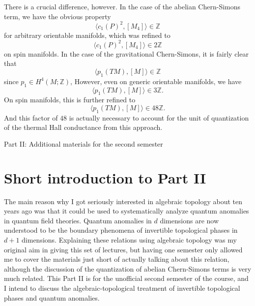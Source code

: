 \documentclass[12pt]{article}
\numberwithin{equation}{section}
\numberwithin{figure}{section}
\theoremstyle{remark}
\def\bZ{\mathbb{Z}}
\begin{document}
There is a crucial difference, however.
In the case of the abelian Chern-Simons term, we have the obvious property
\begin{equation}
\langle c_1(P)^2,[M_4]\rangle \in\bZ
\end{equation} for arbitrary orientable manifolds,
which was refined to \begin{equation}
  \langle c_1(P)^2,[M_4]\rangle \in 2 \bZ
\end{equation} on spin manifolds.
In the case of the gravitational Chern-Simons, 
it is fairly clear that \begin{equation}
\langle p_1(TM),[M] \rangle \in \bZ
\end{equation} since $p_1\in H^4(M;\bZ)$,
However, even on generic orientable manifolds,
we have \begin{equation}
\langle p_1(TM),[M] \rangle \in 3 \bZ.
\end{equation} 
On spin manifolds, this is further refined to \begin{equation}
\langle p_1(TM),[M] \rangle \in 48 \bZ.
\end{equation} 
And this factor of $48$ is actually necessary 
to account for the unit of quantization of the thermal Hall conductance
from this approach.


\newpage

\vbox{}

\vfill

{\LARGE Part II: Additional materials for the second semester}

\vfill

\vbox{}

\newpage

\section*{Short introduction to Part II}

The main reason why I got seriously interested in algebraic topology about ten years ago 
was that it could be used to systematically analyze quantum anomalies in quantum field theories.
Quantum anomalies in $d$ dimensions are now understood to be the boundary phenomena
of invertible topological phases in $d+1$ dimensions.
Explaining these relations using algebraic topology was my original aim in giving this set of lectures,
but having one semester only allowed me to cover the materials just short of 
actually talking about this relation, although the discussion of the quantization of 
abelian Chern-Simons terms is very much related.
This Part II is for the unofficial second semester of the course,
and I intend to discuss the algebraic-topological treatment of 
invertible topological phases and quantum anomalies.
\end{document}
